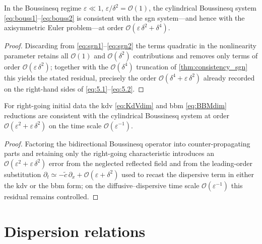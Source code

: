 \documentclass[alpha-refs, 12pt]{wiley-article}
\renewcommand{\O}{\mathcal{O}}
\newcommand{\eps}{\varepsilon}
\begin{document}
\begin{corollary}\label{cor:consistency_bouss}
In the Boussinesq regime $\eps\ll1$, $\eps/\delta^{2}=\O(1)$, the cylindrical Boussinesq system \eqref{eq:bouss1}--\eqref{eq:bouss2} is consistent with the \acrshort{sgn} system---and hence with the axisymmetric Euler problem---at order $\O(\eps\,\delta^{2}+\delta^{4})$.
\end{corollary}
\begin{proof}
Discarding from \eqref{eq:sgn1}--\eqref{eq:sgn2} the terms quadratic in the nonlinearity parameter retains all $\O(1)$ and $\O(\delta^{2})$ contributions and removes only terms of order $\O(\eps\,\delta^{2})$; together with the $\O(\delta^{4})$ truncation of \cref{thm:consistency_sgn} this yields the stated residual, precisely the order $\O(\delta^{4}+\eps\,\delta^{2})$ already recorded on the right-hand sides of \eqref{eq:5.1}--\eqref{eq:5.2}.
\end{proof}

\begin{corollary}\label{cor:consistency_uni}
For right-going initial data the \acrshort{kdv} \eqref{eq:KdVdim} and \acrshort{bbm} \eqref{eq:BBMdim} reductions are consistent with the cylindrical Boussinesq system at order $\O(\eps^{2}+\eps\,\delta^{2})$ on the time scale $\O(\eps^{-1})$.
\end{corollary}
\begin{proof}
Factoring the bidirectional Boussinesq operator into counter-propagating parts and retaining only the right-going characteristic \citep{Olver1988a} introduces an $\O(\eps^{2}+\eps\,\delta^{2})$ error from the neglected reflected field and from the leading-order substitution $\partial_{t}\simeq-\tilde{c}\,\partial_{x}+\O(\eps+\delta^{2})$ used to recast the dispersive term in either the \acrshort{kdv} or the \acrshort{bbm} form; on the diffusive--dispersive time scale $\O(\eps^{-1})$ this residual remains controlled.
\end{proof}

\section{Dispersion relations}\label{sec:dispersion}
\end{document}
